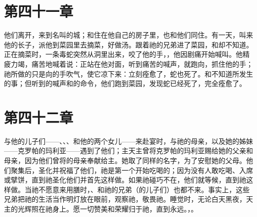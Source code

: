 
\section{第四十一章}

他们离开，来到名叫的城；和住在他自己的房子里，也和他们同住。有一天，叫来他的长子，派他到菜园里去摘菜，好做汤。跟着祂的兄弟进了菜园，和却不知道。正在摘菜时，一条毒蛇突然从洞里出来，咬了他的手，，他因剧痛开始喊叫。他精疲力竭，痛苦地喊着说：正站在他对面，听到痛苦的喊声，就跑向，抓住他的手；祂所做的只是向的手吹气，使它凉下来：立刻痊愈了，蛇也死了。和不知道所发生的事；但听到的喊声和的命令，他们跑到菜园，发现蛇已经死了，完全痊愈了。\par


\section{第四十二章}

与他的儿子们——、、、和他的两个女儿——来赴宴时，与祂的母亲，以及她的姊妹——克罗帕的玛利亚——遇到了他们；主天主曾将克罗帕的玛利亚赐给她的父亲和母亲，因为他们曾将的母亲奉献给主。她取了同样的名字，为了安慰她的父母。他们聚集后，圣化并祝福了他们，祂是第一个开始吃喝的；因为没有人敢吃喝、入席或擘饼，直到祂圣化他们并首先这样做。如果祂碰巧不在，他们就等候，直到祂这样做。当祂不愿意来用膳时，、和祂的兄弟（的儿子们）也都不来。事实上，这些兄弟把祂的生活当作明灯放在眼前，观察祂，敬畏祂。睡觉时，无论白天黑夜，天主的光辉照在祂身上。愿一切赞美和荣耀归于祂，直到永远。，。\par

